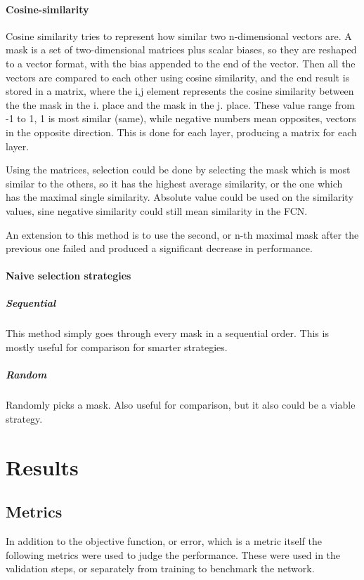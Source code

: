 \documentclass[12pt]{report}
\begin{document}
\subsubsection{Cosine-similarity}Cosine similarity  tries to represent how similar two n-dimensional vectors are. A mask is a set of two-dimensional matrices plus scalar biases, so they are reshaped to a vector format, with the bias appended to the end of the vector. Then all the vectors are compared to each other using cosine similarity, and the end result is stored in a matrix, where the i,j element represents the cosine similarity between the the mask in the i. place and the mask in the j. place. These value range from -1 to 1, 1 is most similar (same), while negative numbers mean opposites, vectors in the opposite direction. This is done for each layer, producing a matrix for each layer.\par
Using the matrices, selection could be done by selecting the mask which is most similar to the others, so it has the highest average similarity, or the one which has the maximal single similarity. Absolute value could be used on the similarity values, sine negative similarity could still mean similarity in the FCN.\par
An extension to this method is to use the second, or n-th maximal mask after the previous one failed and produced a significant decrease in performance.
\subsubsection{Naive selection strategies}
\paragraph{Sequential}This method simply goes through every mask in a sequential order. This is mostly useful for comparison for smarter strategies.
\paragraph{Random}
Randomly picks a mask. Also useful for comparison, but it also could be a viable strategy.
\chapter{Results}
\section{Metrics}
In addition to the objective function, or error, which is a metric itself the following metrics were used to judge the performance. These were used in the validation steps, or separately from training to benchmark the network.
\end{document}
